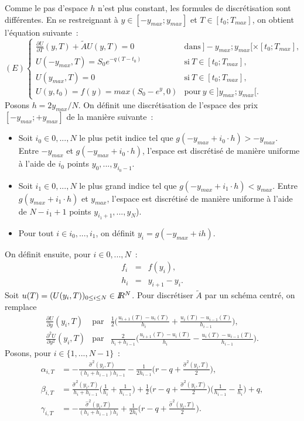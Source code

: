 Comme le pas d'espace $h$ n'est plus constant, les formules de 
discr\'etisation sont diff\'erentes. En se restreignant \`a 
$y \in [-y_{max};y_{max}]$ et $ T \in [t_0;T_{max}]$, on obtient 
l'\'equation suivante~:
$$
(E)
\left \{
\begin{array}{ll}
\frac{\partial U}{\partial T}(y,T) + \tilde{A}U(y,T) = 0 & 
\text{dans}~ ]-y_{max};y_{max}[ \times [t_0;T_{max}],\\
U(-y_{max},T) = S_0e^{-q(T-t_0)} & \text{si}~ T \in [t_0;T_{max}],\\
U(y_{max},T) = 0 &  \text{si}~ T \in [t_0;T_{max}],\\ 
U(y,t_0) = f(y) = max(S_0-e^y,0) & 
\text{pour}~ y \in ]y_{max};y_{max}[. 
\end{array}
\right .
$$
Posons $h=2y_{max}/N$. On d\'efinit une discr\'etisation de l'espace 
des prix $[-y_{max};+y_{max}]$ de la mani\`ere suivante~:
\begin{itemize}
\item Soit $i_0 \in {0,...,N}$ le plus petit indice tel que 
$g(-y_{max} + i_0\cdot h) > -y_{max}$. Entre $-y_{max}$ et 
$g(-y_{max} + i_0\cdot h)$, l'espace est discr\'etis\'e de mani\`ere 
uniforme \`a l'aide de $i_0$ points $y_0,...,y_{i_0-1}$.
\item Soit $i_1 \in {0,...,N}$ le plus grand indice tel que 
$g(-y_{max} + i_1\cdot h) < y_{max}$. Entre $g(y_{max} + i_1\cdot h)$ 
et $y_{max}$, l'espace est discr\'etis\'e de mani\`ere uniforme \`a 
l'aide de $N-i_1+1$ points $y_{i_1+1},...,y_N$).
\item Pour tout $i \in {i_0,...,i_1}$, on d\'efinit 
$y_i = g(-y_{max} + ih)$.
\end{itemize}
On d\'efinit ensuite, pour $i \in {0,...,N}$~:
\begin{eqnarray*}
f_i &=& f(y_i),\\
h_i &=& y_{i+1}-y_i.
\end{eqnarray*}
Soit $u(T) = (U(y_i,T))_{0\leq i\leq N} \in I\!\! R^N$. Pour 
discr\'etiser $\tilde{A}$ par un sch\'ema centr\'e, on remplace
\begin{eqnarray*}
\frac{\partial U}{\partial y}(y_i,T) & \text{par} & 
\frac{1}{2}\biggl ( \frac{u_{i+1}(T)-u_{i}(T)}{h_i} + 
\frac{u_{i}(T)-u_{i-1}(T)}{h_{i-1}}\biggr ),\\
\frac{\partial^2 U}{\partial y^2}(y_i,T) & \text{par} & 
\frac{2}{h_i+h_{i-1}}\biggl(\frac{u_{i+1}(T)-u_i(T)}{h_i} - 
\frac{u_i(T)-u_{i-1}(T)}{h_{i-1}}\biggr).
\end{eqnarray*}
Posons, pour $i \in \{1,...,N-1\}$~: 
\begin{align*}
\alpha_{i,T} &= -\frac{\hat{\sigma}^2(y_i,T)}
{(h_i+h_{i-1})h_{i-1}} - \frac{1}{2h_{i-1}}
\biggl(r-q+\frac{\hat{\sigma}^2(y_i,T)}{2}\biggr),\\
\beta_{i,T} &= \frac{\hat{\sigma}^2(y_i,T)}
{h_i+h_{i-1}}\biggl(\frac{1}{h_i} + \frac{1}{h_{i-1}}\biggr) + 
\frac{1}{2} \biggl (r-q+\frac{\hat{\sigma}^2(y_i,T)}{2}\biggr)
\biggl(\frac{1}{h_{i-1}} - \frac{1}{h_i}\biggr) + q,\\
\gamma_{i,T} &= -\frac{\hat{\sigma}^2(y_i,T)}{(h_i+h_{i-1})h_i} + 
\frac{1}{2h_i}\biggl(r-q+\frac{\hat{\sigma}^2(y_i,T)}{2}\biggr).
\end{align*}
